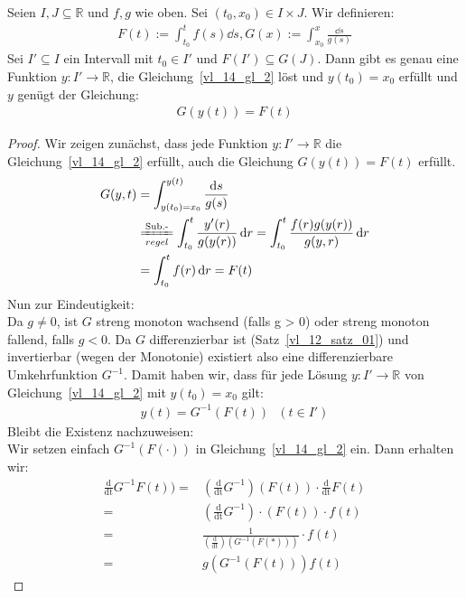 \begin{Satz}{\label{vl_14_satz_1}
	Seien $I, J \subseteq \mathbb{R}$ und $f,g$ wie oben. 
	Sei $(t_0, x_0) \in I \times J$.
	Wir definieren:
	\begin{align*}
		F(t) := \int_{t_0}^t f(s)\dd{s}, G(x) := \int_{x_0}^x \frac{\dd{s}}{g(s)}
	\end{align*}
	Sei $I' \subseteq I$ ein Intervall mit $t_0 \in I'$ und 
	$F(I') \subseteq G(J)$.
	Dann gibt es genau eine Funktion $y : I' \rightarrow \mathbb{R}$, die 
	Gleichung~\ref{vl_14_gl_2} löst und $y(t_0) = x_0$ erfüllt und $y$ genügt der 
	Gleichung:
	\begin{align*}
		G(y(t)) = F(t)
	\end{align*}
}\end{Satz}
\begin{proof}
	Wir zeigen zunächst, dass jede Funktion $y: I' \rightarrow \mathbb{R}$ die 
	Gleichung~\ref{vl_14_gl_2} erfüllt, auch die Gleichung $G(y(t)) = F(t)$ erfüllt.
	\begin{align*}
		G(y,t) & =  \int_{y(t_0) = x_0}^{y(t)}\frac{\dd{s}}{g(s)} \\
		& \xlongequal[regel]{\text{Sub.-}} 
		\int_{t_0}^t\frac{y'(r)}{g(y(r))}\dd{r}
		= \int_{t_0}^t\frac{f(r)g(y(r))}{g(y,r)}\dd{r} \\
		& = \int_{t_0}^t f(r) \dd{r} = F(t)
	\end{align*}
	Nun zur Eindeutigkeit:\\
	Da $g \neq 0$, ist $G$ streng monoton wachsend (falls g > 0) oder streng monoton 
	fallend, falls $g < 0$. Da $G$ differenzierbar ist (Satz~\ref{vl_12_satz_01})
	und invertierbar (wegen der Monotonie) existiert also eine differenzierbare 
	Umkehrfunktion $G^{-1}$. Damit haben wir, dass für jede Lösung 
	$y : I' \rightarrow \mathbb{R}$ von Gleichung~\ref{vl_14_gl_2} mit 
	$y(t_0) = x_0$ gilt:
	\begin{align*}
		y(t) = G^{-1}(F(t)) \text{ } (t \in I')
	\end{align*}
	Bleibt die Existenz nachzuweisen:\\
	Wir setzen einfach $G^{-1}(F(\cdot))$ in Gleichung~\ref{vl_14_gl_2} ein.
	Dann erhalten wir:
	\begin{align*}
		\frac{\mathrm{d}}{\mathrm{dt}} G^{-1}F(t)) 
		= & \left( \frac{\mathrm{d}}{\mathrm{dt}} G^{-1}\right) 
			(F(t)) \cdot \frac{\mathrm{d}}{\mathrm{dt}} F(t) \\
		= & \left(\frac{\mathrm{d}}{\mathrm{dt}}G^{-1}\right)\cdot (F(t)) \cdot f(t)
			\\
		= & \frac{1}{\left(\frac{\mathrm{d}}{\mathrm{dt}}\right)
			\left(G^{-1}(F(*))\right)} \cdot f(t) \\
		= & g\left(G^{-1}(F(t))\right)f(t)
	\end{align*}
\end{proof}

